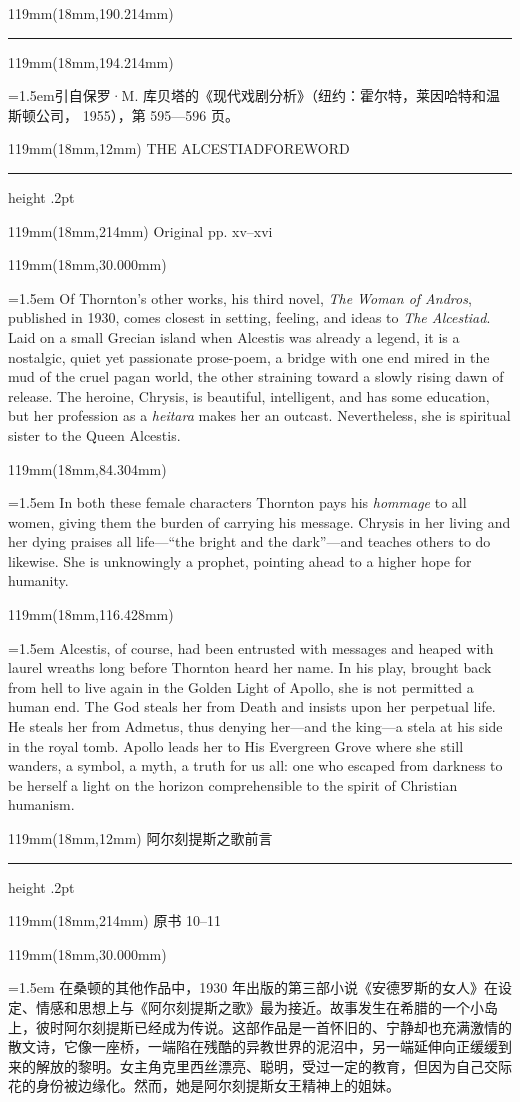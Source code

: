 \documentclass{article}
\newcommand{\ENsetup}{\normalfont\color{ink}\fontsize{11}{16.5}\selectfont\emergencystretch=1.5em}
\newcommand{\ZHsetup}{\normalfont\color{ink}\fontsize{10.5}{17}\selectfont\emergencystretch=1.5em}
\newcommand{\Note}[2]{\par\hangindent=1.5em\hangafter=1\noindent\makebox[1.5em][l]{#1}#2\par}
\newcommand{\Block}[3]{\begin{textblock*}{119mm}(18mm,#1mm){#2 #3\par}\end{textblock*}}
\newcommand{\Heading}[3]{%
  \begin{textblock*}{119mm}(18mm,12mm)
    \color{quiet}\fontsize{7.5}{10}\selectfont
    #1\hfill #2\par\vspace{3mm}\hrule height .2pt
  \end{textblock*}
  \begin{textblock*}{119mm}(18mm,214mm)
    \color{quiet}\fontsize{7}{10}\selectfont #3\hfill\thepage
  \end{textblock*}
}
\begin{document}
\begin{textblock*}{119mm}(18mm,190.214mm)\color{ink}\rule{30mm}{.25pt}\end{textblock*}
\begin{textblock*}{119mm}(18mm,194.214mm)\normalfont\color{ink}\fontsize{7.5}{11}\selectfont \Note{2}{引自保罗·M. 库贝塔的《现代戏剧分析》{\kai （纽约：霍尔特，莱因哈特和温斯顿公司， 1955）}，第 595—596 页。}\end{textblock*}
\newpage
\null
\Heading{THE ALCESTIAD}{FOREWORD}{Original pp. xv–xvi}
\Block{30.000}{\ENsetup}{Of Thornton's other works, his third novel, \textit{The Woman of Andros}, published in 1930, comes closest in setting, feeling, and ideas to \textit{The Alcestiad}. Laid on a small Grecian island when Alcestis was already a legend, it is a nostalgic, quiet yet passionate prose-poem, a bridge with one end mired in the mud of the cruel pagan world, the other straining toward a slowly rising dawn of release. The heroine, Chrysis, is beautiful, intelligent, and has some education, but her profession as a \textit{heitara} makes her an outcast. Nevertheless, she is spiritual sister to the Queen Alcestis.\par}
\Block{84.304}{\ENsetup}{In both these female characters Thornton pays his \textit{hommage} to all women, giving them the burden of carrying his message. Chrysis in her living and her dying praises all life—``the bright and the dark''—and teaches others to do likewise. She is unknowingly a prophet, pointing ahead to a higher hope for humanity.\par}
\Block{116.428}{\ENsetup}{Alcestis, of course, had been entrusted with messages and heaped with laurel wreaths long before Thornton heard her name. In his play, brought back from hell to live again in the Golden Light of Apollo, she is not permitted a human end. The God steals her from Death and insists upon her perpetual life. He steals her from Admetus, thus denying her—and the king—a stela at his side in the royal tomb. Apollo leads her to His Evergreen Grove where she still wanders, a symbol, a myth, a truth for us all: one who escaped from darkness to be herself a light on the horizon comprehensible to the spirit of Christian humanism.\par}
\newpage
\null
\Heading{阿尔刻提斯之歌}{前言}{原书 10–11}
\Block{30.000}{\ZHsetup}{在桑顿的其他作品中，1930 年出版的第三部小说《安德罗斯的女人》在设定、情感和思想上与《阿尔刻提斯之歌》最为接近。故事发生在希腊的一个小岛上，彼时阿尔刻提斯已经成为传说。这部作品是一首怀旧的、宁静却也充满激情的散文诗，它像一座桥，一端陷在残酷的异教世界的泥沼中，另一端延伸向正缓缓到来的解放的黎明。女主角克里西丝漂亮、聪明，受过一定的教育，但因为自己交际花的身份被边缘化。然而，她是阿尔刻提斯女王精神上的姐妹。\par }
\end{document}
